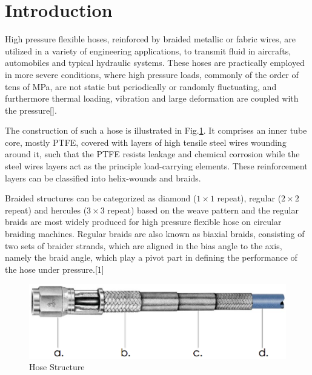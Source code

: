 \section{Introduction}
\label{introduction}

High pressure flexible hoses, reinforced by braided metallic or fabric wires, are utilized in a variety of engineering applications, to transmit fluid in aircrafts, automobiles and typical hydraulic systems. 
These hoses are practically employed in more severe conditions, where high pressure loads, commonly of the order of tens of MPa,  are not static but periodically or randomly fluctuating, and furthermore thermal loading, vibration and large deformation are coupled with the pressure[]. 



The construction of such a hose is illustrated in Fig.\ref{fig:Hose-Structure}. It comprises an inner tube core, mostly PTFE, covered with layers of high tensile steel wires wounding around it, such that the PTFE resists leakage and chemical corrosion while the steel wires layers act as the principle load-carrying elements. These reinforcement layers can be classified into helix-wounds and braids. 






Braided structures can be categorized as diamond ($ 1 \times 1 $ repeat), regular ($ 2 \times 2 $ repeat) and hercules ($ 3 \times 3 $ repeat) based on the weave pattern \cite{Rawal:2015dq}  and the regular braids are most widely produced for high pressure flexible hose on circular braiding machines.
Regular braids  are also known as biaxial braids, consisting of two sets of braider strands, which are aligned in the bias angle to the axis, namely the braid angle, which play a pivot part in defining the performance of the hose under pressure.[1]

\begin{figure}[h]
\centering
\includegraphics[width=0.7\linewidth]{figures/Hose-Structure}
\caption{Hose Structure}
\label{fig:Hose-Structure}
\end{figure}





